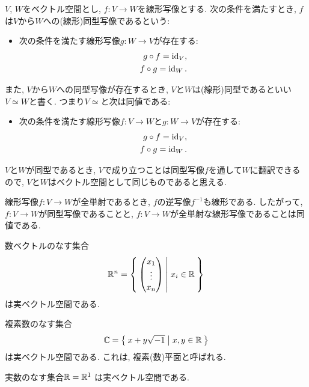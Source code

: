 \begin{definition}
  $V$, $W$をベクトル空間とし,
  $f\colon V\to W$を線形写像とする.
  次の条件を満たすとき,
  $f$は$V$から$W$への(線形)同型写像であるという:
  \begin{itemize}
  \item 次の条件を満たす線形写像$g\colon W\to V$が存在する:
    \begin{align*}
      g\circ f =\operatorname{id}_V,\\
      f\circ g =\operatorname{id}_W.
    \end{align*}
  \end{itemize}
  また, $V$から$W$への同型写像が存在するとき,
  $V$と$W$は(線形)同型であるといい$V\simeq W$と書く.
  つまり$V\simeq$と次は同値である:
  \begin{itemize}
  \item 次の条件を満たす線形写像$f\colon V\to W$と$g\colon W\to V$が存在する:
    \begin{align*}
      g\circ f =\operatorname{id}_V,\\
      f\circ g =\operatorname{id}_W.
    \end{align*}
  \end{itemize}
\end{definition}
\begin{remark}
  $V$と$W$が同型であるとき,
  $V$で成り立つことは同型写像$f$を通して$W$に翻訳できるので,
  $V$と$W$はベクトル空間として同じものであると思える.
\end{remark}
\begin{remark}
  線形写像$f\colon V\to W$が全単射であるとき,
  $f$の逆写像$f^{-1}$も線形である.
  したがって,
  $f\colon V\to W$が同型写像であることと,
  $f\colon V\to W$が全単射な線形写像であることは同値である.
\end{remark}
\begin{example}
  数ベクトルのなす集合
  \begin{align*}
    \mathbb{R}^n=\Set{\begin{pmatrix}x_1\\\vdots\\x_n\end{pmatrix}|x_i\in\mathbb{R}}
  \end{align*}
  は実ベクトル空間である. 
\end{example}
\begin{example}
  複素数のなす集合
  \begin{align*}
    \mathbb{C}=\Set{x+y\sqrt{-1}|x,y\in\mathbb{R}}
  \end{align*}
  は実ベクトル空間である.
  これは, 複素(数)平面と呼ばれる.
\end{example}
\begin{example}
  実数のなす集合$\mathbb{R}=\mathbb{R}^1$
  は実ベクトル空間である.
\end{example}

